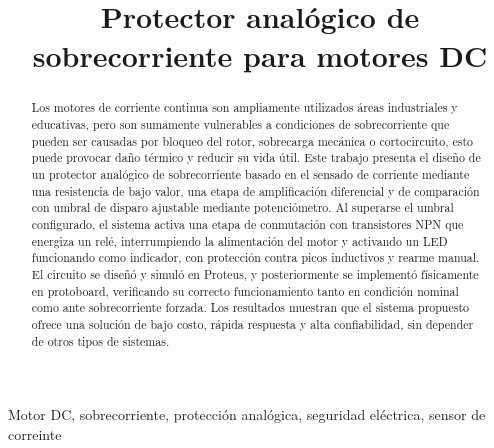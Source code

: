 \documentclass[conference]{IEEEtran}
\begin{document}
\title{Protector analógico de sobrecorriente para motores DC\\}
\author{
    \and
}

\maketitle

\begin{abstract}
Los motores de corriente continua son ampliamente utilizados áreas industriales y educativas, pero son sumamente vulnerables a condiciones de sobrecorriente que pueden ser causadas por bloqueo del rotor, sobrecarga mecánica o cortocircuito, esto puede provocar daño térmico y reducir su vida útil. 
Este trabajo presenta el diseño de un protector analógico de sobrecorriente basado en el sensado de corriente mediante una resistencia de bajo valor, una etapa de amplificación diferencial y de comparación con umbral de disparo ajustable mediante potenciómetro. 
Al superarse el umbral configurado, el sistema activa una etapa de conmutación con transistores NPN que energiza un relé, interrumpiendo la alimentación del motor y activando un LED funcionando como indicador, con protección contra picos inductivos y rearme manual. 
El circuito se diseñó y simuló en Proteus, y posteriormente se implementó físicamente en protoboard, verificando su correcto funcionamiento tanto en condición nominal como ante sobrecorriente forzada. Los resultados muestran que el sistema propuesto ofrece una solución de bajo costo, rápida respuesta y alta confiabilidad, sin depender de otros tipos de sistemas.\\
\end{abstract}

\begin{IEEEkeywords}
Motor DC, sobrecorriente, protección analógica, seguridad eléctrica, sensor de correinte
\end{IEEEkeywords}
\end{document}
